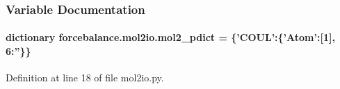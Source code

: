 \subsubsection{Variable Documentation}
\hypertarget{namespaceforcebalance_1_1mol2io_a9a28a68a67a02946036ee03f9685f3ba}{
\paragraph[{mol2\-\_\-pdict}]{\setlength{\rightskip}{0pt plus 5cm}dictionary forcebalance.\-mol2io.\-mol2\-\_\-pdict = \{'C\-O\-U\-L'\-:\{'Atom'\-:\mbox{[}1\mbox{]}, 6\-:''\}\}}}\label{namespaceforcebalance_1_1mol2io_a9a28a68a67a02946036ee03f9685f3ba}


Definition at line 18 of file mol2io.\-py.

